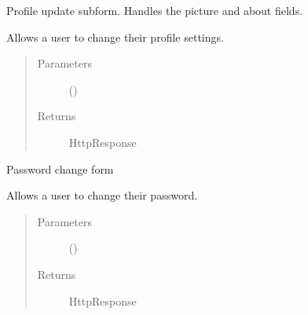 \documentclass[letterpaper,10pt,english]{sphinxmanual}
\begin{document}

\begin{fulllineitems}
\label{\detokenize{accounts:accounts.views.blurb_form_upload}}
Profile update sub\sphinxhyphen{}form. Handles the picture and about fields.

Allows a user to change their profile settings.
\begin{quote}\begin{description}
\item[{Parameters}] \leavevmode
{} () \textendash{} 

\item[{Returns}] \leavevmode
HttpResponse

\end{description}\end{quote}

\end{fulllineitems}


\begin{fulllineitems}
\label{\detokenize{accounts:accounts.views.change_password}}
Password change form

Allows a user to change their password.
\begin{quote}\begin{description}
\item[{Parameters}] \leavevmode
{} () \textendash{} 

\item[{Returns}] \leavevmode
HttpResponse

\end{description}\end{quote}

\end{fulllineitems}
\end{document}
